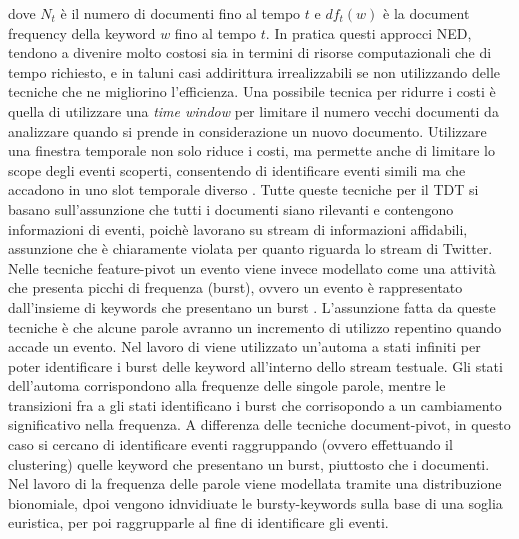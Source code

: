 \documentclass[a4paper,12pt]{report}
\begin{document}
dove $N_t$ è il numero di documenti fino al tempo $t$ e $df_t(w)$ è la document frequency della keyword $w$ fino al tempo $t$.
In pratica questi approcci NED, tendono a divenire molto costosi sia in termini di risorse computazionali che di tempo richiesto, e in taluni casi addirittura irrealizzabili se non utilizzando delle tecniche che ne migliorino l'efficienza. Una possibile tecnica per ridurre i costi è quella di utilizzare una \emph{time window} \cite{Luo:2007:RRN:1247480.1247536,Papka:1999:ONE:897559} per limitare il numero vecchi documenti da analizzare quando si prende in considerazione un nuovo documento. Utilizzare una finestra temporale non solo riduce i costi, ma permette anche di limitare lo scope degli eventi scoperti, consentendo di identificare eventi simili ma che accadono in uno slot temporale diverso \cite{Yang:1998:SRO:290941.290953}. Tutte queste tecniche per il TDT si basano sull'assunzione che tutti i documenti siano rilevanti e contengono informazioni di eventi, poichè lavorano su stream di informazioni affidabili,  assunzione che è chiaramente violata  per quanto riguarda lo stream di Twitter.
Nelle tecniche feature-pivot un evento viene invece modellato come una attività che presenta picchi di frequenza (burst), ovvero un evento è rappresentato dall'insieme di keywords che presentano un burst \cite{Allan:2002:TDT:772260}. L'assunzione fatta da queste tecniche è che alcune parole avranno un incremento di utilizzo repentino quando accade un evento. Nel lavoro di \cite{Kleinberg:2002:BHS:775047.775061} viene utilizzato un'automa a stati infiniti per poter identificare i burst delle keyword all'interno dello stream testuale. Gli stati dell'automa corrispondono alla frequenze delle singole parole, mentre le transizioni fra a gli stati identificano i burst che corrisopondo a un  cambiamento significativo nella frequenza.
A differenza delle tecniche document-pivot, in questo caso si cercano di identificare eventi raggruppando (ovvero effettuando il clustering)   quelle keyword che presentano un burst, piuttosto che i documenti. Nel lavoro di \cite{Allan:2002:TDT:772260} la frequenza delle parole viene modellata tramite una distribuzione bionomiale, dpoi vengono idnvidiuate le bursty-keywords sulla base di una soglia euristica, per poi raggrupparle al fine di identificare gli eventi.
\end{document}
